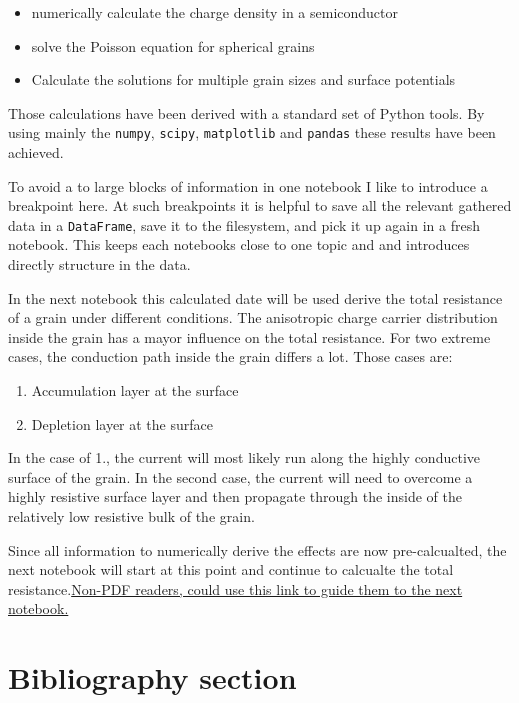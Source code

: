 \documentclass[11pt]{article}
\providecommand{\tightlist}{%
      \setlength{\itemsep}{0pt}\setlength{\parskip}{0pt}}
\begin{document}
\begin{itemize}
\tightlist
\item
  numerically calculate the charge density in a semiconductor
\item
  solve the Poisson equation for spherical grains
\item
  Calculate the solutions for multiple grain sizes and surface
  potentials
\end{itemize}

Those calculations have been derived with a standard set of Python
tools. By using mainly the \texttt{numpy}, \texttt{scipy},
\texttt{matplotlib} and \texttt{pandas} these results have been
achieved.

To avoid a to large blocks of information in one notebook I like to
introduce a breakpoint here. At such breakpoints it is helpful to save
all the relevant gathered data in a \texttt{DataFrame}, save it to the
filesystem, and pick it up again in a fresh notebook. This keeps each
notebooks close to one topic and and introduces directly structure in
the data.

In the next notebook this calculated date will be used derive the total
resistance of a grain under different conditions. The anisotropic charge
carrier distribution inside the grain has a mayor influence on the total
resistance. For two extreme cases, the conduction path inside the grain
differs a lot. Those cases are:

\begin{enumerate}
\def\labelenumi{\arabic{enumi}.}
\tightlist
\item
  Accumulation layer at the surface
\item
  Depletion layer at the surface
\end{enumerate}

In the case of 1., the current will most likely run along the highly
conductive surface of the grain. In the second case, the current will
need to overcome a highly resistive surface layer and then propagate
through the inside of the relatively low resistive bulk of the grain.

Since all information to numerically derive the effects are now
pre-calcualted, the next notebook will start at this point and continue
to calcualte the total
resistance.\href{./3-Resistance-sensor.ipynb}{Non-PDF readers, could use
this link to guide them to the next notebook.}

    \hypertarget{bibliography-section}{%
\section{Bibliography section}\label{bibliography-section}}

    



    
    
    
\end{document}
